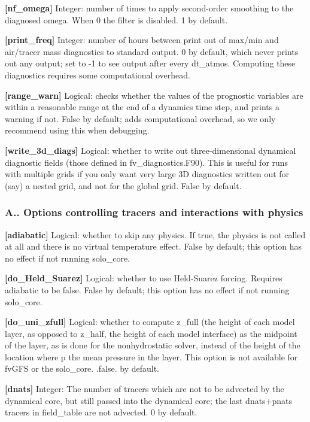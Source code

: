 {\bfseries \mbox{[}nf\+\_\+omega\mbox{]}} Integer\+: number of times to apply second-\/order smoothing to the diagnosed omega. When 0 the filter is disabled. 1 by default.

{\bfseries \mbox{[}print\+\_\+freq\mbox{]}} Integer\+: number of hours between print out of max/min and air/tracer mass diagnostics to standard output. 0 by default, which never prints out any output; set to -\/1 to see output after every dt\+\_\+atmos. Computing these diagnostics requires some computational overhead.

{\bfseries \mbox{[}range\+\_\+warn\mbox{]}} Logical\+: checks whether the values of the prognostic variables are within a reasonable range at the end of a dynamics time step, and prints a warning if not. False by default; adds computational overhead, so we only recommend using this when debugging.

{\bfseries \mbox{[}write\+\_\+3d\+\_\+diags\mbox{]}} Logical\+: whether to write out three-\/dimensional dynamical diagnostic fields (those defined in fv\+\_\+diagnostics.\+F90). This is useful for runs with multiple grids if you only want very large 3D diagnostics written out for (say) a nested grid, and not for the global grid. False by default.

\subsubsection*{A.. Options controlling tracers and interactions with physics}

{\bfseries \mbox{[}adiabatic\mbox{]}} Logical\+: whether to skip any physics. If true, the physics is not called at all and there is no virtual temperature effect. False by default; this option has no effect if not running solo\+\_\+core.

{\bfseries \mbox{[}do\+\_\+\+Held\+\_\+\+Suarez\mbox{]}} Logical\+: whether to use Held-\/\+Suarez forcing. Requires adiabatic to be false. False by default; this option has no effect if not running solo\+\_\+core.

{\bfseries \mbox{[}do\+\_\+uni\+\_\+zfull\mbox{]}} Logical\+: whether to compute z\+\_\+full (the height of each model layer, as opposed to z\+\_\+half, the height of each model interface) as the midpoint of the layer, as is done for the nonhydrostatic solver, instead of the height of the location where p the mean pressure in the layer. This option is not available for fv\+G\+FS or the solo\+\_\+core. .false. by default.

{\bfseries \mbox{[}dnats\mbox{]}} Integer\+: The number of tracers which are not to be advected by the dynamical core, but still passed into the dynamical core; the last dnats+pnats tracers in field\+\_\+table are not advected. 0 by default.

